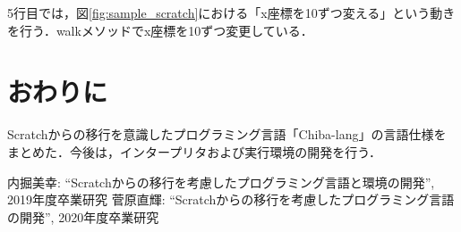 \documentclass[twocolumn,10pt,a4j]{ltjsarticle}
\begin{document}
5行目では，図\ref{fig:sample_scratch}における「x座標を10ずつ変える」という動きを行う．walkメソッドでx座標を10ずつ変更している．


\section{おわりに}
Scratchからの移行を意識したプログラミング言語「Chiba-lang」の言語仕様をまとめた．今後は，インタープリタおよび実行環境の開発を行う．

\begin{thebibliography}{99}
 内掘美幸: ``Scratchからの移行を考慮したプログラミング言語と環境の開発'', 2019年度卒業研究
 菅原直輝: ``Scratchからの移行を考慮したプログラミング言語の開発'', 2020年度卒業研究
\end{thebibliography}
\end{document}
